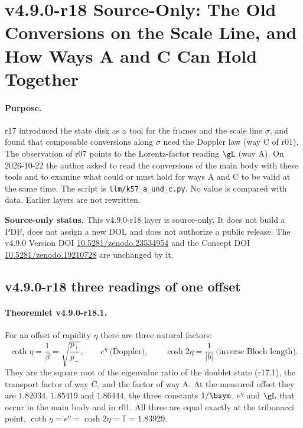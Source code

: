 \clearpage
\section*{v4.9.0-r18 Source-Only: The Old Conversions on the Scale Line, and How Ways A and C Can Hold Together}
\label{sec:v490-r18-scale-line-a-and-c}

\paragraph{Purpose.}
r17 introduced the state disk as a tool for the frames and the scale line \(\sigma\), and found that composable conversions
along \(\sigma\) need the Doppler law (way C of r01).  The observation of r07 points to the Lorentz-factor reading \(\gL\)
(way A).  On 2026-10-22 the author asked to read the conversions of the main body with these tools and to examine what could
or must hold for ways A and C to be valid at the same time.  The script is \texttt{llm/k57\_a\_und\_c.py}.  No value is compared
with data.  Earlier layers are not rewritten.

\noindent\textbf{Source-only status.}
This v4.9.0-r18 layer is source-only.  It does not build a PDF, does not assign a new DOI,
and does not authorize a public release.  The v4.9.0 Version DOI
\href{https://doi.org/10.5281/zenodo.23534954}{10.5281/zenodo.23534954} and the Concept DOI
\href{https://doi.org/10.5281/zenodo.19210728}{10.5281/zenodo.19210728} are unchanged by it.

\subsection*{v4.9.0-r18 three readings of one offset}
\label{subsec:v490-r18-three-readings}

\paragraph{Theoremlet v4.9.0-r18.1.}
For an offset of rapidity \(\eta\) there are three natural factors:
\[
\coth\eta=\frac1\beta=\sqrt{\frac{p_+}{p_-}},\qquad
e^{\eta}\ \text{(Doppler)},\qquad
\cosh2\eta=\frac1{|b|}\ \text{(inverse Bloch length)}.
\]
They are the square root of the eigenvalue ratio of the doublet state (r17.1), the transport factor of way C, and the factor
of way A.  At the measured offset they are \(1.82034\), \(1.85419\) and \(1.86444\), the three constants \(1/\bsym\), \(e^\eta\) and
\(\gL\) that occur in the main body and in r01.  All three are equal exactly at the tribonacci point,
\(\coth\eta=e^\eta=\cosh2\eta=\mathbb T=1.83929\).

